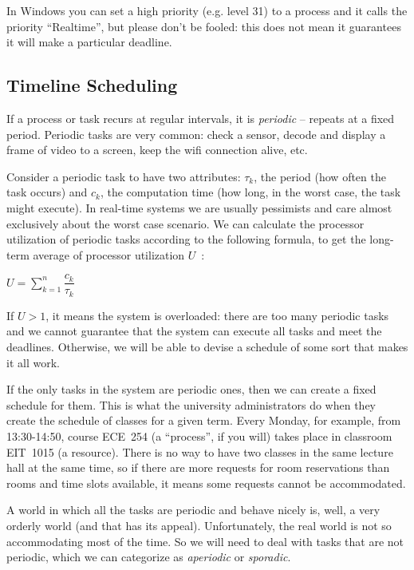 In Windows you can set a high priority (e.g. level 31) to a process and it calls the priority ``Realtime'', but please don't be fooled: this does not mean it guarantees it will make a particular deadline.

\subsection*{Timeline Scheduling}
If a process or task recurs at regular intervals, it is \textit{periodic} -- repeats at a fixed period. Periodic tasks are very common: check a sensor, decode and display a frame of video to a screen, keep the wifi connection alive, etc.

Consider a periodic task to have two attributes: $\tau_{k}$, the period (how often the task occurs) and $c_{k}$, the computation time (how long, in the worst case, the task might execute). In real-time systems we are usually pessimists and care almost exclusively about the worst case scenario. We can calculate the processor utilization of periodic tasks according to the following formula, to get the long-term average of processor utilization $U$~\cite{mte241}:

\begin{center}
$U = \sum\limits_{k=1}^n\dfrac{c_{k}}{\tau_{k}}$
\end{center}

If $U > 1$, it means the system is overloaded: there are too many periodic tasks and we cannot guarantee that the system can execute all tasks and meet the deadlines. Otherwise, we will be able to devise a schedule of some sort that makes it all work.

If the only tasks in the system are periodic ones, then we can create a fixed schedule for them. This is what the university administrators do when they create the schedule of classes for a given term. Every Monday, for example, from 13:30-14:50, course ECE~254 (a ``process'', if you will) takes place in classroom EIT~1015 (a resource). There is no way to have two classes in the same lecture hall at the same time, so if there are more requests for room reservations than rooms and time slots available, it means some requests cannot be accommodated.

A world in which all the tasks are periodic and behave nicely is, well, a very orderly world (and that has its appeal). Unfortunately, the real world is not so accommodating most of the time. So we will need to deal with tasks that are not periodic, which we can categorize as \textit{aperiodic} or \textit{sporadic}.

